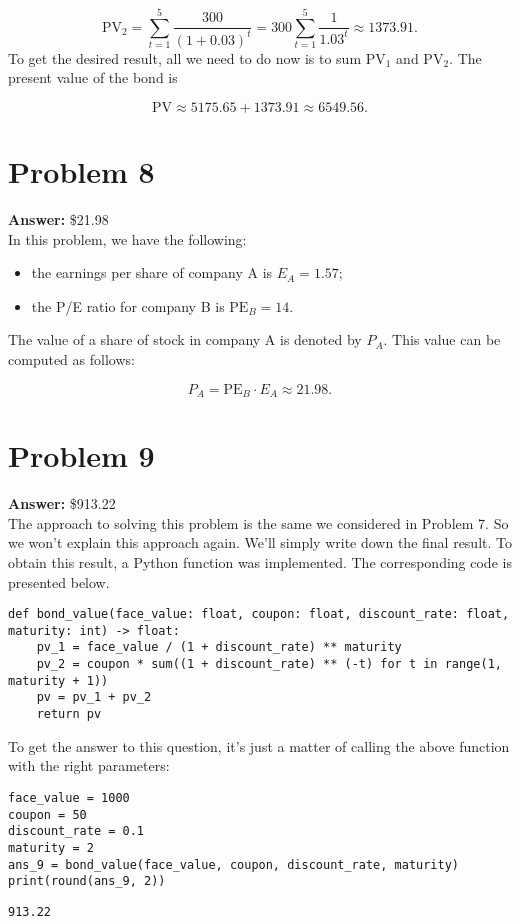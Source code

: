 \documentclass[11pt]{article}
\newcommand{\pv}{\mathrm{PV}}
\begin{document}
\begin{equation}
\pv_2=\sum_{t=1}^5\frac{300}{(1+0.03)^t}=300\sum_{t=1}^5\frac{1}{1.03^t}\approx 1373.91.
\end{equation}
To get the desired result, all we need to do now is to sum \(\pv_1\) and
\(\pv_2\). The present value of the bond is

\begin{equation}
\pv\approx 5175.65+1373.91\approx 6549.56.
\end{equation}
\section*{Problem 8}
\label{sec:orge97df85}

\textbf{Answer:} \$21.98\\

In this problem, we have the following:
\begin{itemize}
\item the earnings per share of company A is \(E_A=1.57\);
\item the P/E ratio for company B is \(\mathrm{PE}_B=14\).
\end{itemize}
The value of a share of stock in company A is denoted by \(P_A\). This value
can be computed as follows:

\begin{equation}
P_A=\mathrm{PE}_B\cdot E_A\approx 21.98.
\end{equation}
\section*{Problem 9}
\label{sec:org663b005}

\textbf{Answer:} \$913.22\\

The approach to solving this problem is the same we considered in Problem 7. So
we won't explain this approach again. We'll simply write down the final result.
To obtain this result, a Python function was implemented. The corresponding code
is presented below.
\begin{verbatim}
def bond_value(face_value: float, coupon: float, discount_rate: float, maturity: int) -> float:
    pv_1 = face_value / (1 + discount_rate) ** maturity
    pv_2 = coupon * sum((1 + discount_rate) ** (-t) for t in range(1, maturity + 1))
    pv = pv_1 + pv_2
    return pv
\end{verbatim}
To get the answer to this question, it's just a matter of calling the above
function with the right parameters:
\begin{verbatim}
face_value = 1000
coupon = 50
discount_rate = 0.1
maturity = 2
ans_9 = bond_value(face_value, coupon, discount_rate, maturity)
print(round(ans_9, 2))
\end{verbatim}
\label{problem_9}
\begin{verbatim}
913.22
\end{verbatim}
\end{document}
